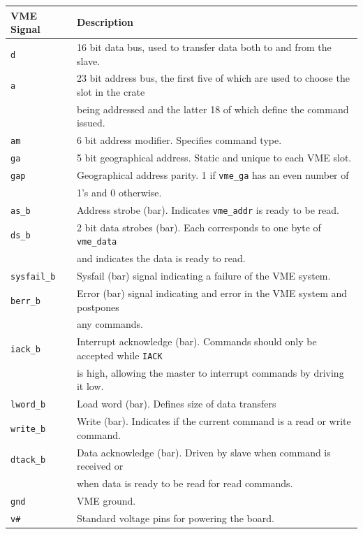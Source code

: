 \documentclass[10pt,a4paper]{article}
\begin{document}
\begin{table}[H]
\centering
\begin{tabular}{|l|l|} \hline
VME Signal& Description\\ \hline
\texttt{d}& 16 bit data bus, used to transfer data both to and from the slave.\\ \hline
\texttt{a}& 23 bit address bus, the first five of which are used to choose the slot in the crate\\
                  & being addressed and the latter 18 of which define the command issued.\\ \hline
\texttt{am}& 6 bit address modifier. Specifies command type.\\ 
\texttt{ga}& 5 bit geographical address. Static and unique to each VME slot.\\ \hline
\texttt{gap}& Geographical address parity. 1 if \texttt{vme\_ga} has an even number of \\
                 & 1's and 0 otherwise. \\ \hline
\texttt{as\_b}& Address strobe (bar). Indicates \texttt{vme\_addr} is ready to be read. \\
\texttt{ds\_b}& 2 bit data strobes (bar). Each corresponds to one byte of \texttt{vme\_data} \\
                   & and indicates the data is ready to read. \\
\texttt{sysfail\_b}& Sysfail (bar) signal indicating a failure of the VME system. \\
\texttt{berr\_b}& Error (bar) signal indicating and error in the VME system and postpones \\
                     & any commands.\\ \hline
\texttt{iack\_b}& Interrupt acknowledge (bar). Commands should only be accepted while \texttt{IACK}\\
                     & is high, allowing the master to interrupt commands by driving it low. \\ \hline
\texttt{lword\_b}& Load word (bar). Defines size of data transfers \\ \hline 
\texttt{write\_b}& Write (bar). Indicates if the current command is a read or write command.\\ \hline
\texttt{dtack\_b}& Data acknowledge (bar). Driven by slave when command is received or\\
                          & when data is ready to be read for read commands.\\ \hline
\texttt{gnd}& VME ground. \\ \hline
\texttt{v\#}& Standard voltage pins for powering the board. \\ \hline \hline


\end{tabular}
\end{table}
\end{document}
